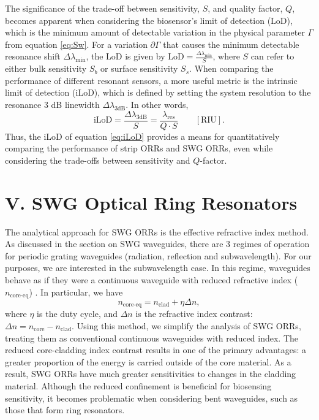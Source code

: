 \documentclass[aps,prl,twocolumn, superscriptaddress,nobalancelastpage]{revtex4}
\begin{document}
The significance of the trade-off between sensitivity, $S$, and quality factor, $Q$, becomes apparent when considering the biosensor's limit of detection (LoD), which is the minimum amount of detectable variation in the physical parameter $\Gamma$ from equation \eqref{eq:Sw}. For a variation $\partial \Gamma$ that causes the minimum detectable resonance shift $\Delta \lambda_\text{min}$, the LoD is given by $\text{LoD} = \frac{\Delta \lambda_\text{min}}{S}$, where $S$ can refer to either bulk sensitivity $S_b$ or surface sensitivity $S_s$. When comparing the performance of different resonant sensors, a more useful metric is the intrinsic limit of detection (iLoD), which is defined by setting the system resolution to the resonance 3 dB linewidth $\Delta \lambda_\text{3dB}$. In other words, \begin{equation}
\text{iLoD} = \frac{\Delta\lambda_\text{3dB}}{S} = \frac{\lambda_\text{res}}{Q\cdot S} \qquad \left[\text{RIU}\right].
\label{eq:iLoD}
\end{equation}
Thus, the iLoD of equation \eqref{eq:iLoD} provides a means for quantitatively comparing the performance of strip ORRs and SWG ORRs, even while considering the trade-offs between sensitivity and $Q$-factor. 

\section{V. SWG Optical Ring Resonators} %
\vspace{-1em}
The analytical approach for SWG ORRs is the effective refractive index method. As discussed in the section on SWG waveguides, there are 3 regimes of operation for periodic grating waveguides (radiation, reflection and subwavelength). For our purposes, we are interested in the subwavelength case. In this regime, waveguides behave as if they were a continuous waveguide with reduced refractive index ($n_\text{core-eq}$) \cite{swg3}. In particular, we have
\begin{equation}
    n_\text{core-eq} = n_\text{clad} + \eta \Delta n,
    \label{eq:n_eq}
\end{equation}
where $\eta$ is the duty cycle, and $\Delta n$ is the refractive index contrast:  $\Delta n = n_\text{core} - n_\text{clad}$. Using this method, we simplify the analysis of SWG ORRs, treating them as conventional continuous waveguides with reduced index. The reduced core-cladding index contrast results in one of the primary advantages: a greater proportion of the energy is carried outside of the core material. As a result, SWG ORRs have much greater sensitivities to changes in the cladding material. Although the reduced confinement is beneficial for biosensing sensitivity, it becomes problematic when considering bent waveguides, such as those that form ring resonators.
\end{document}
